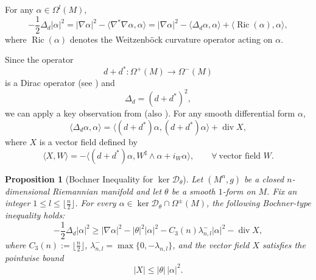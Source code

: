 \documentclass[12pt, twoside]{article}
\newtheorem{proposition}[theorem]{Proposition}
\theoremstyle{definition}
\numberwithin{equation}{section}
\begin{document}
	For any \(\alpha\in\Omega^{l}(M)\),
	\begin{equation}\label{eq:bochner-basic}
	-\frac{1}{2}\Delta_{d}|\alpha|^{2}
	=|\nabla\alpha|^{2}-\langle\nabla^{*}\nabla\alpha,\alpha\rangle
	=|\nabla\alpha|^{2}-\langle\Delta_{d}\alpha,\alpha\rangle
	+\langle\operatorname{Ric}(\alpha),\alpha\rangle,
	\end{equation}
	where \(\operatorname{Ric}(\alpha)\) denotes the Weitzenb\"ock curvature operator acting on \(\alpha\).
	
	Since the operator \[d+d^{*}:\Omega^{+}(M)\to\Omega^{-}(M)\] is a Dirac operator (see \cite{Lawson1989}) and \[\Delta_{d}=(d+d^{*})^{2},\] 
	we can apply a key observation from \cite{Chen2024b} (also \cite[Page 115, Proposition 5.3]{Lawson1989}). For any smooth differential form \(\alpha\),
	\begin{equation}\label{eq:div-representation}
	\langle\Delta_{d}\alpha,\alpha\rangle
	=\langle(d+d^{*})\alpha,(d+d^{*})\alpha\rangle+\operatorname{div} X,
	\end{equation}
	where \(X\) is a vector field defined by
	\begin{equation}\label{eq:V-definition}
	\langle X,W\rangle
	=-\langle(d+d^{*})\alpha,W^{\sharp}\wedge\alpha+i_{W}\alpha\rangle,
	\qquad\forall\ \text{vector field }W.
	\end{equation}
	\begin{proposition}[Bochner Inequality for \(\ker\mathcal{D}_{\theta}\)] \cite[Proposition 3.7]{Huang2025}\label{prop:bochner-kerD}
		Let \((M^{n},g)\) be a closed \(n\)-dimensional Riemannian manifold and let \(\theta\) be a smooth \(1\)-form on \(M\). 
		Fix an integer \(1 \leq l \le \lfloor\frac{n}{2} \rfloor\). For every \(\alpha \in \ker\mathcal{D}_{\theta} \cap \Omega^{\pm}(M)\), the following Bochner-type inequality holds:
		\begin{equation}\label{eq:bochner-ineq}
		-\frac{1}{2}\Delta_{d}|\alpha|^{2}
		\ge |\nabla\alpha|^{2} - |\theta|^{2}|\alpha|^{2}
		- C_{3}(n)\lambda^{-}_{n,l}|\alpha|^{2} - \operatorname{div} X,
		\end{equation}
			where $C_{3}(n):=\lfloor\frac{n}{2}\rfloor$,  \(\lambda^{-}_{n,l} = \max\{0, -\lambda_{n,l}\}\), 
		and the vector field \(X\) satisfies the pointwise bound
		\[
		|X| \le |\theta| \, |\alpha|^{2}.
		\]
	\end{proposition}
	
\end{document}

